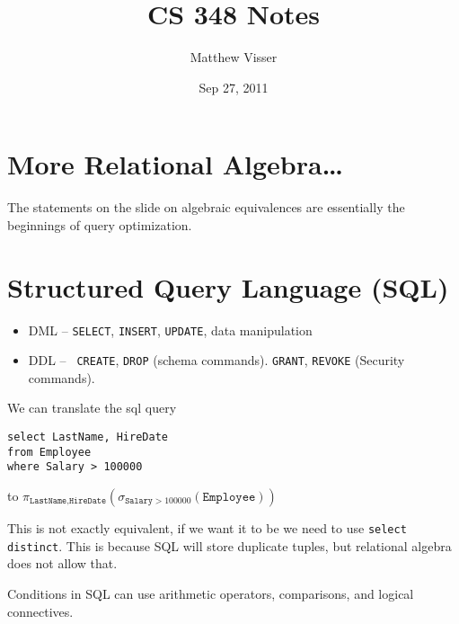 \documentclass[12pt]{article}
\begin{document}
\title{CS 348 Notes}
\author{Matthew Visser}
\date{Sep 27, 2011}
\maketitle

\section{More Relational Algebra\dots}

The statements on the slide on algebraic equivalences are essentially the
beginnings of query optimization.

\section{Structured Query Language (SQL)}

\begin{itemize}
    \item DML -- \texttt{SELECT}, \texttt{INSERT}, \texttt{UPDATE}, data
        manipulation
    \item DDL -- \texttt{ CREATE}, \texttt{DROP} (schema commands). \texttt{GRANT},
        \texttt{REVOKE} (Security commands).
\end{itemize}

We can translate the sql query
\begin{verbatim}
select LastName, HireDate
from Employee
where Salary > 100000
\end{verbatim}
to $\pi_{ \texttt{LastName,HireDate} }(\sigma_{\texttt{Salary} >
100000}(\texttt{Employee}))$

This is not exactly equivalent, if we want it to be we need to use
\texttt{select distinct}. This is because SQL will store duplicate tuples, but
relational algebra does not allow that.

Conditions in SQL can use arithmetic operators, comparisons, and logical
connectives.
\end{document}
